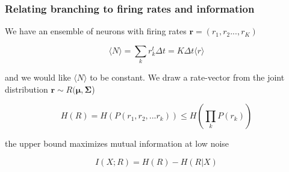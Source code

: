 \documentclass{beamer}
\begin{document}
\begin{frame}[plain]
\frametitle{Relating branching to firing rates and information} 

We have an ensemble of neurons with firing rates $\bm{r} = (r_{1}, r_{2} ..., r_{K})$

\begin{equation*}
\langle N \rangle = \sum_{k} r_{k}^{t}\Delta t = K  \Delta t \langle r \rangle
\end{equation*}

and we would like $\langle N \rangle$ to be constant. We draw a rate-vector from the joint distribution $\bm{r} \sim R(\bm{\mu}, \bm{\Sigma}$) 

\begin{equation*}
H(R) = H(P(r_{1}, r_{2}, ... r_{k})) \leq H\left(\prod_{k} P(r_{k})\right)
\end{equation*}

the upper bound maximizes mutual information at low noise

\begin{equation*}
I(X;R) = H(R) - H(R|X)
\end{equation*}

\end{frame}


\begin{thebibliography}{99} 
\end{thebibliography}
\end{document}
